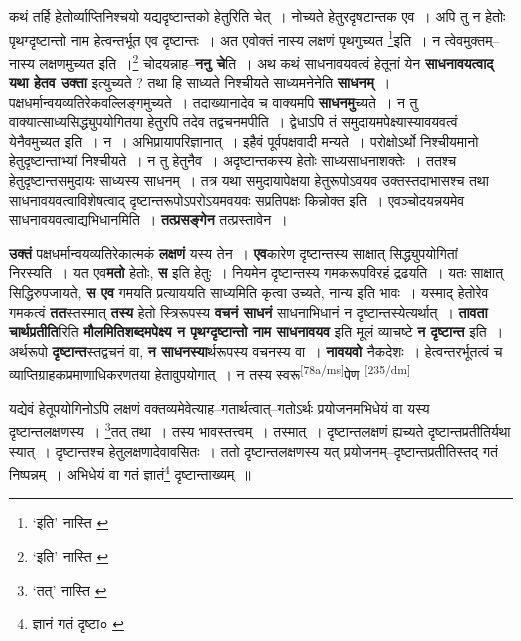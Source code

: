 \documentclass[article,12pt,a4paper]{memoir}
\begin{document}
	कथं तर्हि हेतोर्व्याप्तिनिश्चयो यद्यदृष्टान्तको हेतुरिति चेत् । नोच्यते हेतुरदृषटान्तक एव । अपि तु न हेतोः पृथग्दृष्टान्तो नाम हेत्वन्तर्भूत एव दृष्टान्तः । अत एवोक्तं नास्य लक्षणं पृथगुच्यत \footnote{‘इति’ नास्ति \cite{dp-msB} \cite{dp-msD}}इति । न त्वेवमुक्तम्--नास्य लक्षणमुच्यत इति ।\footnote{‘इति’ नास्ति \cite{dp-msB}} चोदयन्नाह--\textbf{ननु चे}ति । अथ कथं साधनावयवत्वं हेतूनां येन \textbf{साधनावयत्वाद् यथा हेतव उक्ता} इत्युच्यते ? तथा हि साध्यते निश्चीयते साध्यमनेनेति \textbf{साधनम्} । पक्षधर्मान्वयव्यतिरेकवल्लिङ्गमुच्यते । तदाख्यानादेव च वाक्यमपि \textbf{साधनमु}च्यते । न तु वाक्यात्साध्यसिद्ध्युपयोगितया हेतुरपि तदेव तद्वचनमपीति । द्वेधाऽपि तं समुदायमपेक्ष्यास्यावयवत्वं येनैवमुच्यत इति । न । अभिप्रायापरिज्ञानात् । इहैवं पूर्वपक्षवादी मन्यते । परोक्षोऽर्थो निश्चीयमानो हेतुदृष्टान्ताभ्यां निश्चीयते । न तु हेतुनैव । अदृष्टान्तकस्य हेतोः साध्यसाधनाशक्तेः । ततश्च हेतुदृष्टान्तसमुदायः साध्यस्य साधनम् । तत्र यथा समुदायापेक्षया हेतुरूपोऽवयव उक्तस्तदाभासश्च तथा साधनावयवत्वाविशेषत्वाद् दृष्टान्तरूपोऽपरोऽयमवयवः सप्रतिपक्षः किन्नोक्त इति । एवञ्चोदयन्नयमेव साधनावयवत्वाद्यभिधानमिति । \textbf{तत्प्रसङ्गेन} तत्प्रस्तावेन ।
	\pend
      

	  \pstart \textbf{उक्तं} पक्षधर्मान्वयव्यतिरेकात्मकं \textbf{लक्षणं} यस्य तेन । \textbf{एव}कारेण दृष्टान्तस्य साक्षात् सिद्ध्युपयोगितां निरस्यति । यत एव\textbf{मतो} हेतोः, \textbf{स} इति हेतुः । नियमेन दृष्टान्तस्य गमकरूपविरहं द्रढयति । यतः साक्षात् सिद्धिरुपजायते, \textbf{स एव} गमयति प्रत्याययति साध्यमिति कृत्वा उच्यते, नान्य इति भावः । यस्माद् हेतोरेव गमकत्वं \textbf{तत}स्तस्मात् \textbf{तस्य} हेतो स्त्रिरूपस्य \textbf{वचनं साधनं} साधनाभिधानं न दृष्टान्तस्येत्यर्थात् । \textbf{तावता चार्थप्रतीति}रिति \textbf{मौलमितिशब्दमपेक्ष्य न पृथग्दृष्टान्तो नाम साधनावयव} इति मूलं व्याचष्टे \textbf{न दृष्टान्त} इति । अर्थरूपो \textbf{दृष्टान्त}स्तद्वचनं वा, \textbf{न साधनस्या}र्थरूपस्य वचनस्य वा । \textbf{नावयवो} नैकदेशः । हेत्वन्तरर्भूतत्वं च व्याप्तिग्राहकप्रमाणाधिकरणतया हेतावुपयोगात् । न तस्य स्वरू\leavevmode\textsuperscript{\rmlatinfont\tiny [78a/ms]}पेण  \leavevmode\textsuperscript{\rmlatinfont\tiny [235/dm]} 
	  
	यद्येवं हेतूपयोगिनोऽपि लक्षणं वक्तव्यमेवेत्याह--गतार्थत्वात्--गतोऽर्थः प्रयोजनमभिधेयं वा यस्य दृष्टान्तलक्षणस्य । \footnote{‘तत्’ नास्ति \cite{dp-edE} \cite{dp-edN}}तत् तथा । तस्य भावस्तत्त्वम् । तस्मात् । दृष्टान्तलक्षणं ह्यच्यते दृष्टान्तप्रतीतिर्यथा स्यात् । दृष्टान्तश्च हेतुलक्षणादेवावसितः । ततो दृष्टान्तलक्षणस्य यत् प्रयोजनम्--दृष्टान्तप्रतीतिस्तद् गतं निष्पन्नम् । अभिधेयं वा गतं ज्ञातं\footnote{ज्ञानं \cite{dp-msB} \cite{dp-edP} \cite{dp-edH} \cite{dp-edE} गतं दृष्टा० \cite{dp-msA}} दृष्टान्ताख्यम् ॥ 
	  
\end{document}

